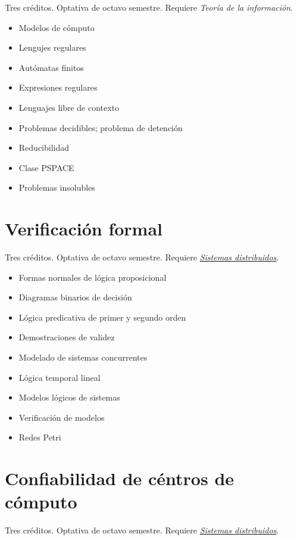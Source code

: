 \documentclass{article}
\begin{document}
\begin{multicols}{4}
Tres cr\'{e}ditos. Optativa de octavo semestre. Requiere
{\em Teor\'{i}a de la informaci\'{o}n}.

\begin{itemize}
\item{Modelos de c\'{o}mputo}
\item{Lengujes regulares}
\item{Aut\'{o}matas finitos}
\item{Expresiones regulares}
\item{Lenguajes libre de contexto}
\item{Problemas decidibles; problema de detenci\'{o}n}
\item{Reducibilidad}
\item{Clase PSPACE}
\item{Problemas insolubles}
\end{itemize}

\vfill\null \columnbreak

\hypertarget{vf}{\section*{Verificaci\'{o}n formal}} 

Tres cr\'{e}ditos. Optativa de octavo semestre. Requiere
\hyperlink{sdi}{\em Sistemas distribuidos}.

\begin{itemize}
\item{Formas normales de l\'{o}gica proposicional}
\item{Diagramas binarios de decisi\'{o}n}
\item{L\'{o}gica predicativa de primer y segundo orden}
\item{Demostraciones de validez}
\item{Modelado de sistemas concurrentes}
\item{L\'{o}gica temporal lineal}
\item{Modelos l\'{o}gicos de sistemas}
\item{Verificaci\'{o}n de modelos}
\item{Redes Petri}
\end{itemize}


\newpage

\hypertarget{cdc}{\section*{Confiabilidad de c\'{e}ntros de c\'{o}mputo}} 

Tres cr\'{e}ditos. Optativa de octavo semestre. Requiere
\hyperlink{sdi}{\em Sistemas distribuidos}.


\end{multicols}
\end{document}

